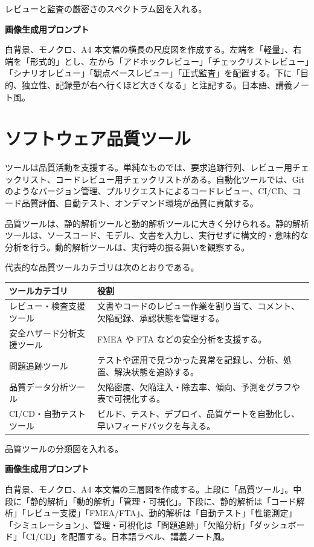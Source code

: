 \documentclass[11pt,a4paper]{article}
\begin{document}
\begin{todobox}
レビューと監査の厳密さのスペクトラム図を入れる。\par
\textbf{画像生成用プロンプト}\par
白背景、モノクロ、A4 本文幅の横長の尺度図を作成する。左端を「軽量」、右端を「形式的」とし、左から「アドホックレビュー」「チェックリストレビュー」「シナリオレビュー」「観点ベースレビュー」「正式監査」を配置する。下に「目的、独立性、記録量が右へ行くほど大きくなる」と注記する。日本語、講義ノート風。
\end{todobox}

\section{ソフトウェア品質ツール}
ツールは品質活動を支援する。単純なものでは、要求追跡行列、レビュー用チェックリスト、コードレビュー用チェックリストがある。自動化ツールでは、Git のようなバージョン管理、プルリクエストによるコードレビュー、CI/CD、コード品質評価、自動テスト、オンデマンド環境が品質に貢献する。

品質ツールは、静的解析ツールと動的解析ツールに大きく分けられる。静的解析ツールは、ソースコード、モデル、文書を入力し、実行せずに構文的・意味的な分析を行う。動的解析ツールは、実行時の振る舞いを観察する。

代表的な品質ツールカテゴリは次のとおりである。

\noindent\begin{tabularx}{\textwidth}{@{}L{0.28\textwidth}Y@{}}
\toprule
\textbf{ツールカテゴリ} & \textbf{役割} \\
\midrule
レビュー・検査支援ツール & 文書やコードのレビュー作業を割り当て、コメント、欠陥記録、承認状態を管理する。 \\
安全ハザード分析支援ツール & FMEA や FTA などの安全分析を支援する。 \\
問題追跡ツール & テストや運用で見つかった異常を記録し、分析、処置、解決状態を追跡する。 \\
品質データ分析ツール & 欠陥密度、欠陥注入・除去率、傾向、予測をグラフや表で可視化する。 \\
CI/CD・自動テストツール & ビルド、テスト、デプロイ、品質ゲートを自動化し、早いフィードバックを与える。 \\
\bottomrule
\end{tabularx}


\begin{todobox}
品質ツールの分類図を入れる。\par
\textbf{画像生成用プロンプト}\par
白背景、モノクロ、A4 本文幅の三層図を作成する。上段に「品質ツール」。中段に「静的解析」「動的解析」「管理・可視化」。下段に、静的解析は「コード解析」「レビュー支援」「FMEA/FTA」、動的解析は「自動テスト」「性能測定」「シミュレーション」、管理・可視化は「問題追跡」「欠陥分析」「ダッシュボード」「CI/CD」を配置する。日本語ラベル、講義ノート風。
\end{todobox}
\end{document}
